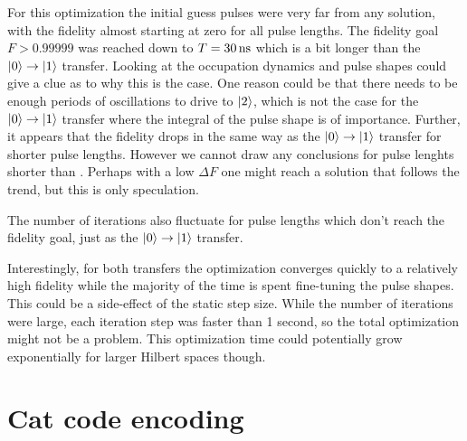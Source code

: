\documentclass[main.tex]{subfiles}
\begin{document}
For this optimization the initial guess pulses were very far from any solution, with the fidelity almost starting at zero for all pulse lengths.
The fidelity goal \(F > 0.99999\) was reached down to \(T = \SI{30}{\nano\second}\) which is a bit longer than the \(\ket{0}\rightarrow\ket{1}\) transfer.
Looking at the occupation dynamics and pulse shapes could give a clue as to why this is the case.
One reason could be that there needs to be enough periods of oscillations to drive to \(\ket{2}\), which is not the case for the \(\ket{0}\rightarrow\ket{1}\) transfer where the integral of the pulse shape is of importance.
Further, it appears that the fidelity drops in the same way as the \(\ket{0}\rightarrow\ket{1}\) transfer for shorter pulse lengths.
However we cannot draw any conclusions for pulse lenghts shorter than .
Perhaps with a low \(\Delta F\) one might reach a solution that follows the trend, but this is only speculation.

The number of iterations also fluctuate for pulse lengths which don't reach the fidelity goal, just as the \(\ket{0}\rightarrow\ket{1}\) transfer.

Interestingly, for both transfers the optimization converges quickly to a relatively high fidelity while the majority of the time is spent fine-tuning the pulse shapes.
This could be a side-effect of the static step size.
While the number of iterations were large, each iteration step was faster than 1 second, so the total optimization might not be a problem.
This optimization time could potentially grow exponentially for larger Hilbert spaces though.

\section{Cat code encoding}


\end{document}
